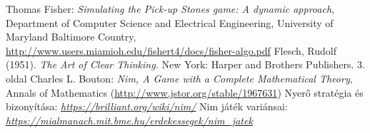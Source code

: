 \begin{thebibliography}{x}
 Thomas Fisher: {\em Simulating the Pick-up Stones game: A dynamic approach}, Department of Computer Science and Electrical Engineering,
University of Maryland Baltimore Country, {\ttfamily \url{ http://www.users.miamioh.edu/fishert4/docs/fisher-algo.pdf}}
Flesch, Rudolf (1951). {\em The Art of Clear Thinking.} New York: Harper and Brothers Publishers. 3. oldal
 Charles L. Bouton: {\em Nim, A Game with a Complete Mathematical Theory}, Annals of Mathematics (\url{http://www.jstor.org/stable/1967631})
Nyerő stratégia és bizonyítása: {\em \url{ https://brilliant.org/wiki/nim/}}
Nim játék variánsai: {\em \url{https://mialmanach.mit.bme.hu/erdekessegek/nim_jatek}}
\end{thebibliography}
